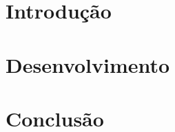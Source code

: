 \documentclass[12pt, oneside]{book}
\begin{document}
\frontmatter



\maketitle

\tableofcontents

\listoffigures

\listoftables

\mainmatter

\chapter{Introdução}


\chapter{Desenvolvimento}


\chapter{Conclusão}


\backmatter

\printbibliography[heading=bibintoc]
\nocite{*}
\end{document}
